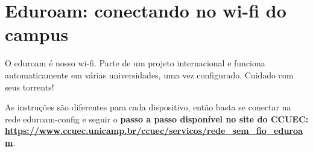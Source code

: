 \section{Eduroam: conectando no wi-fi do campus}

O eduroam é nosso wi-fi. Parte de um projeto internacional e funciona automaticamente em várias universidades, uma vez configurado. Cuidado com seus torrents!

As instruções são diferentes para cada dispositivo, então basta se conectar na rede eduroam-config e seguir o \textbf{passo a passo disponível no site do CCUEC: \url{https://www.ccuec.unicamp.br/ccuec/servicos/rede_sem_fio_eduroam}}.